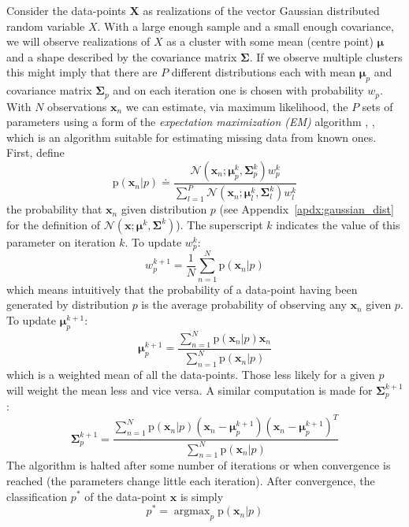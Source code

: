 \documentclass[letterpaper,12pt]{report}
\newcommand\ddfrac[2]{\frac{\displaystyle #1}{\displaystyle #2}}
\DeclareMathOperator{\argmax}{argmax}
\begin{document}
Consider the data-points $\boldsymbol{X}$ as realizations of the vector Gaussian
distributed random variable
$X$. With a large enough sample and a small enough covariance, we will observe
realizations of $X$ as a cluster with some mean (centre point) $\boldsymbol{\mu}$ and a shape
described by the covariance matrix $\boldsymbol{\Sigma}$. If we observe multiple
clusters this might imply that there are $P$ different distributions each with
mean $\boldsymbol{\mu}_p$ and covariance matrix $\boldsymbol{\Sigma}_p$ and on each
iteration one is chosen with probability $w_p$. With $N$ observations
$\boldsymbol{x}_{n}$ we can estimate, via maximum likelihood, the $P$ sets of
parameters using a form of the \textit{expectation maximization (EM)} algorithm
\cite{moon1996expectation}, \cite{dempster1977maximum}, which is an algorithm
suitable for estimating missing data from known ones. First, define
\[
    \mathrm{p} \left( \boldsymbol{x}_{n} | p \right)
    \doteq
    \ddfrac{
        \mathcal{N} \left( \boldsymbol{x}_{n}; \boldsymbol{\mu}^{k}_{p} ,
        \boldsymbol{\Sigma}^{k}_{p} \right) w^{k}_{p}
    }{
        \sum_{l=1}^{P}
        \mathcal{N} \left( \boldsymbol{x}_{n}; \boldsymbol{\mu}^{k}_{l} ,
        \boldsymbol{\Sigma}^{k}_{l} \right) w^{k}_{l}
    }
\]
the probability that $\boldsymbol{x}_n$ given distribution $p$ (see
Appendix~\ref{apdx:gaussian_dist} for the definition of $\mathcal{N} \left(
\boldsymbol{x} ; \boldsymbol{\mu}^{k} , \boldsymbol{\Sigma}^{k} \right)$). The superscript $k$
indicates the value of this parameter on iteration $k$. To update $w^{k}_p$:
\[
    w^{k+1}_p = \frac{1}{N} \sum_{n=1}^{N} \mathrm{p} \left( \boldsymbol{x}_n |
    p \right)
\]
which means intuitively that the probability of a data-point having been
generated by distribution $p$ is the average probability of observing any
$\boldsymbol{x}_n$ given $p$. To update $\boldsymbol{\mu}^{k+1}_p$:
\[
    \boldsymbol{\mu}^{k+1}_p
    =
    \ddfrac{\sum_{n=1}^{N} \mathrm{p} \left( \boldsymbol{x}_n |
    p \right) \boldsymbol{x}_n }{\sum_{n=1}^{N} \mathrm{p} \left( \boldsymbol{x}_n |
    p \right)}
\]
which is a weighted mean of all the data-points. Those less likely for a
given $p$ will weight the mean less and vice versa. A similar computation is
made for $\boldsymbol{\Sigma}^{k+1}_p$:
\[
    \boldsymbol{\Sigma}^{k+1}_p
    =
    \ddfrac{\sum_{n=1}^{N} \mathrm{p} \left( \boldsymbol{x}_n | p \right)
        \left( \boldsymbol{x}_n - \boldsymbol{\mu}^{k+1}_p \right) \left(
        \boldsymbol{x}_n - \boldsymbol{\mu}^{k+1}_p \right)^{T}
    }{
        \sum_{n=1}^{N} \mathrm{p} \left( \boldsymbol{x}_n | p \right)
    }
\]
The algorithm is halted after some number of iterations or when convergence is
reached (the parameters change little each iteration). After convergence, the
classification $p^{\ast}$ of the data-point $\boldsymbol{x}$ is simply
\[
    p^{\ast} = \argmax_{p} \mathrm{p} \left( \boldsymbol{x}_n | p \right)
\]
\end{document}
